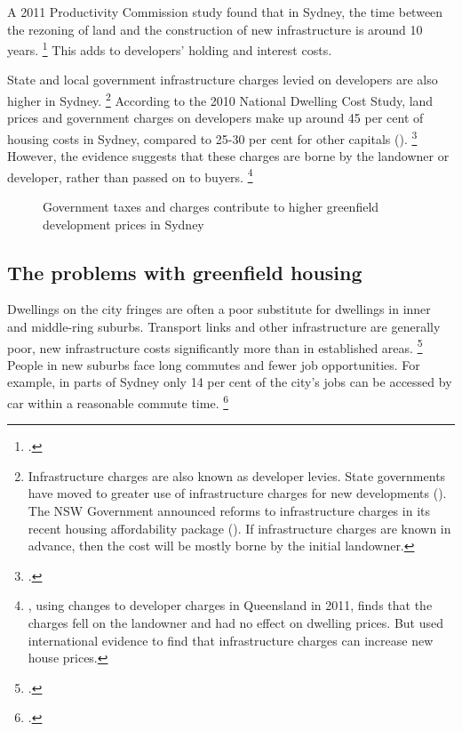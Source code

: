 A 2011 Productivity Commission study found that in Sydney, the time between the rezoning of land and the construction of new infrastructure is around 10 years.%
	\footcite[][142--143]{PC2011PerformanceBenchmark}
This adds to developers' holding and interest costs.

State and local government infrastructure charges levied on developers are also higher in Sydney.%
	\footnote{Infrastructure charges are also known as developer levies.
	State governments have moved to greater use of infrastructure charges for new developments (\textcite{HsiehEtAlSupply2012}).
	The NSW Government announced reforms to infrastructure charges in its recent housing affordability package (\textcite{NSWGovFirstHome2017}). If infrastructure charges are known in advance, then the cost will be mostly borne by the initial landowner.}
According to the 2010 National Dwelling Cost Study, land prices and government charges on developers make up around 45 per cent of housing costs in Sydney, compared to 25-30 per cent for other capitals ().%
	\footcites{Urbis2011Housing}{UDIA2017StateofLand}
However, the evidence suggests that these charges are borne by the landowner or developer, rather than passed on to buyers.%
	\footnote{\textcite{Murray_2018_Developers_pay_charges}, using changes to developer charges in Queensland in 2011, finds that the charges fell on the landowner and had no effect on dwelling prices.
	But \textcite{BryantEves2014Infrastructure} used international evidence to find that infrastructure charges can increase new house prices.}

\begin{figure}
\caption{Government taxes and charges contribute to higher greenfield development prices in Sydney}\label{fig:greenfield-land-cost-base}
\end{figure}


\subsection{The problems with greenfield housing }\label{subsec:the-problems-with-greenfield-housing}

Dwellings on the city fringes are often a poor substitute for dwellings in inner and middle-ring suburbs.
Transport links and other infrastructure are generally poor, new infrastructure costs significantly more than in established areas.%
	\footcite{HamiltonKellett2017Cost}
People in new suburbs face long commutes and fewer job opportunities.
For example, in parts of Sydney only 14 per cent of the city's jobs can be accessed by car within a reasonable commute time.%
	\footcite{KellyDonegan2015-City-limits}

